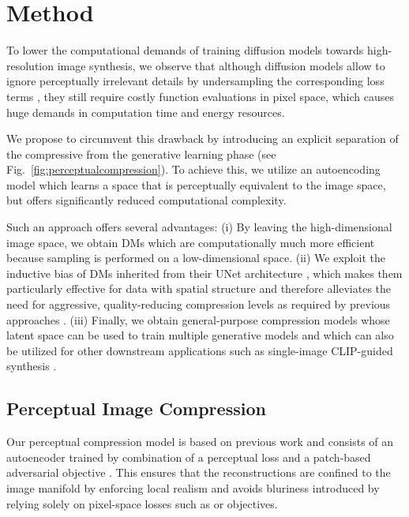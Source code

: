 \documentclass[10pt,twocolumn,letterpaper]{article}
\begin{document}
\section{Method}
\enlargethispage{\baselineskip}
\label{sec:method}
\vspace{-0.5em}
To lower the computational demands of training diffusion models towards high-resolution image synthesis, 
we observe
that although diffusion models 
allow
to ignore perceptually irrelevant details by undersampling the corresponding loss terms \cite{DBLP:conf/nips/HoJA20}, 
they still require costly function evaluations in pixel space,
which causes
huge demands in computation time and energy resources. 


We propose to circumvent this drawback by introducing an explicit separation
 of the compressive from the generative learning phase (see
 Fig.~\ref{fig:perceptualcompression}).
To achieve this, we utilize an autoencoding model which learns a space that is perceptually equivalent to the image space, 
but offers significantly reduced computational complexity.



Such an approach offers several advantages: (i)
By leaving the high-dimensional image space, we 
obtain DMs which are computationally much more efficient
because sampling is performed on a low-dimensional space.
(ii)
We exploit the inductive bias of DMs inherited from their UNet architecture
\cite{DBLP:conf/miccai/RonnebergerFB15}, which makes them particularly effective for data with spatial
structure and therefore
alleviates the need for aggressive, quality-reducing compression levels as required by previous
approaches \cite{DBLP:journals/corr/abs-2012-09841,
DBLP:journals/corr/abs-2102-12092}.
(iii)
Finally, we obtain general-purpose compression models whose latent space 
can be used to train multiple generative models
and which can also be utilized
for other downstream applications such as single-image CLIP-guided synthesis \cite{Frans2021CLIPDrawET}.




\subsection{Perceptual Image Compression}
\vspace{-0.5em}
\label{subsec:stageone}
Our perceptual compression model 
is based on previous work \cite{DBLP:journals/corr/abs-2012-09841} and
consists of an autoencoder trained by combination of a perceptual
loss \cite{lpips} and a patch-based \cite{DBLP:conf/cvpr/IsolaZZE17} adversarial objective \cite{dosovitskiy201perceptual, DBLP:journals/corr/abs-2012-09841, yu2021vectorquantized}. 
This ensures that the reconstructions are 
confined to the image manifold by enforcing local realism and avoids bluriness introduced by relying solely on pixel-space losses
such as  or  objectives.
\end{document}
